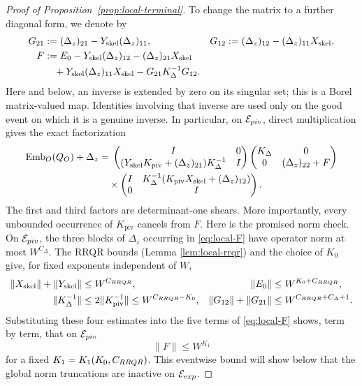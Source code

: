 \documentclass[10pt,a4paper]{amsart}
\begin{document}
\begin{proof}[Proof of Proposition~\ref{prop:local-terminal}]
To change the matrix to a further diagonal form, we denote by
\begin{align}
 G_{21}&:=(\Delta_z)_{21}
          -Y_{\mathrm{skel}}(\Delta_z)_{11},
 &G_{12}&:=(\Delta_z)_{12}
          -(\Delta_z)_{11}X_{\mathrm{skel}},
 \label{eq:local-Gs}\\
 F&:=E_0-Y_{\mathrm{skel}}(\Delta_z)_{12}
       -(\Delta_z)_{21}X_{\mathrm{skel}}\notag\\
  &\quad+Y_{\mathrm{skel}}(\Delta_z)_{11}X_{\mathrm{skel}}
       -G_{21}K_\Delta^{-1}G_{12}.
 \label{eq:local-F}
\end{align}
Here and below, an inverse is extended by zero on its singular set; this
is a Borel matrix-valued map.  Identities involving that inverse are used
only on the good event on which it is a genuine inverse.  In particular,
on \(\mathcal E_{\rm piv}\), direct multiplication gives the exact
factorization
\begin{align}
 \operatorname{Emb}_O(Q_O)+\Delta_z
 &={}
 \begin{pmatrix}
  I&0\\
  (Y_{\mathrm{skel}}K_{\mathrm{piv}}
    +(\Delta_z)_{21})K_\Delta^{-1}&I
 \end{pmatrix}
 \begin{pmatrix}K_\Delta&0\\0&(\Delta_z)_{22}+F\end{pmatrix}
 \notag\\
 &\quad\times
 \begin{pmatrix}
  I&K_\Delta^{-1}(K_{\mathrm{piv}}X_{\mathrm{skel}}
                    +(\Delta_z)_{12})\\
  0&I
 \end{pmatrix}.
 \label{eq:local-CUR}
\end{align}
The first
and third factors are determinant-one shears.  More importantly, every
unbounded occurrence of \(K_{\mathrm{piv}}\) cancels from \(F\).
Here is the promised norm check.  On \(\mathcal E_{\rm piv}\), the three
blocks of \(\Delta_z\) occurring in \eqref{eq:local-F} have operator norm
at most \(W^{C_\Delta}\).  The RRQR bounds (Lemma \ref{lem:local-rrqr}) and the
choice of \(K_0\) give, for fixed exponents independent of \(W\),
\begin{align}
 \|X_{\mathrm{skel}}\|+\|Y_{\mathrm{skel}}\|
 &\leq W^{C_{\rm RRQR}},&
 \|E_0\|&\leq W^{K_0+C_{\rm RRQR}},\notag\\
 \|K_\Delta^{-1}\|
 &\leq2\|K_{\mathrm{piv}}^{-1}\|
 \leq W^{C_{\rm RRQR}-K_0},&
 \|G_{12}\|+\|G_{21}\|
 &\leq W^{C_{\rm RRQR}+C_\Delta+1}.
 \label{eq:local-CUR-term-bounds}
\end{align}
Substituting these four estimates into the five terms of
\eqref{eq:local-F} shows, term by term, that on
\(\mathcal E_{\rm piv}\)
\begin{equation}
 \|F\|\leq W^{K_1}
 \label{eq:local-F-bound}
\end{equation}
for a fixed \(K_1=K_1(K_0,C_{\rm RRQR})\).  This eventwise bound will
show below that the global norm truncations are
inactive on \(\mathcal E_{\rm exp}\).


\end{proof}
\end{document}
